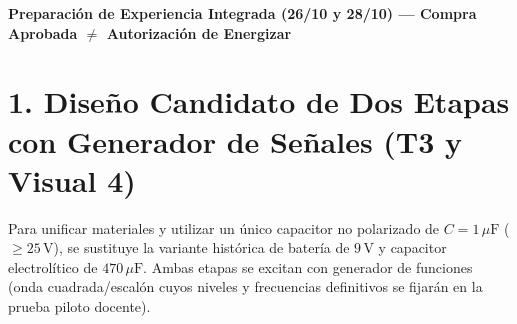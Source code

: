 \documentclass[11pt, a4paper]{article}
\begin{document}
\begin{tcolorbox}[colback=ucbblue!5!white, colframe=ucbblue, title=\textbf{Artefacto A3: Brief Técnico RC–RLC y BOM de Compra Aprobada (W12S3)}]
    \centering \textbf{Preparación de Experiencia Integrada (26/10 y 28/10) — Compra Aprobada $\neq$ Autorización de Energizar}
\end{tcolorbox}

\section*{1. Diseño Candidato de Dos Etapas con Generador de Señales (T3 y Visual 4)}
Para unificar materiales y utilizar un único capacitor no polarizado de $C = 1\,\mu\text{F}$ ($\ge 25\,\text{V}$), se sustituye la variante histórica de batería de $9\,\text{V}$ y capacitor electrolítico de $470\,\mu\text{F}$. Ambas etapas se excitan con generador de funciones (onda cuadrada/escalón cuyos niveles y frecuencias definitivos se fijarán en la prueba piloto docente).
\end{document}
